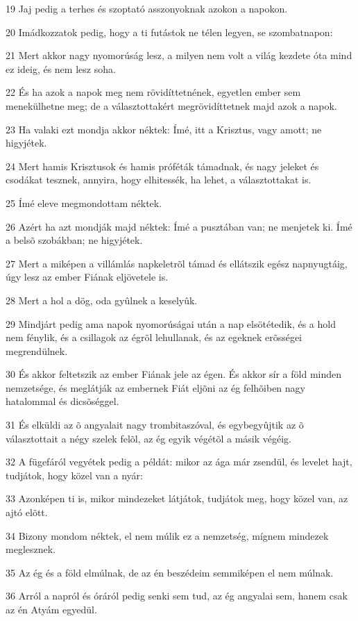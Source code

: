 \par 19 Jaj pedig a terhes és szoptató asszonyoknak azokon a napokon.
\par 20 Imádkozzatok pedig, hogy a ti futástok ne télen legyen, se szombatnapon:
\par 21 Mert akkor nagy nyomorúság lesz, a milyen nem volt a világ kezdete óta mind ez ideig, és nem lesz soha.
\par 22 És ha azok a napok meg nem rövidíttetnének, egyetlen ember sem menekülhetne meg; de a választottakért megrövidíttetnek majd azok a napok.
\par 23 Ha valaki ezt mondja akkor néktek: Ímé, itt a Krisztus, vagy amott; ne higyjétek.
\par 24 Mert hamis Krisztusok és hamis próféták támadnak, és nagy jeleket és csodákat tesznek, annyira, hogy elhitessék, ha lehet, a választottakat is.
\par 25 Ímé eleve megmondottam néktek.
\par 26 Azért ha azt mondják majd néktek: Ímé a pusztában van; ne menjetek ki. Ímé a belsõ szobákban; ne higyjétek.
\par 27 Mert a miképen a villámlás napkeletrõl támad és ellátszik egész napnyugtáig, úgy lesz az ember Fiának eljövetele is.
\par 28 Mert a hol a dög, oda gyûlnek a keselyûk.
\par 29 Mindjárt pedig ama napok nyomorúságai után a nap elsötétedik, és a hold nem fénylik, és a csillagok az égrõl lehullanak, és az egeknek erõsségei megrendülnek.
\par 30 És akkor feltetszik az ember Fiának jele az égen. És akkor sír a föld minden nemzetsége, és meglátják az embernek Fiát eljõni az ég  felhõiben nagy hatalommal és dicsõséggel.
\par 31 És elküldi az õ angyalait nagy trombitaszóval, és egybegyûjtik az õ választottait a négy szelek felõl, az ég egyik végétõl a másik végéig.
\par 32 A fügefáról vegyétek pedig a példát: mikor az ága már zsendül, és levelet hajt, tudjátok, hogy közel van a nyár:
\par 33 Azonképen ti is, mikor mindezeket látjátok, tudjátok meg, hogy közel van, az ajtó elõtt.
\par 34 Bizony mondom néktek, el nem múlik ez a nemzetség, mígnem mindezek meglesznek.
\par 35 Az ég és a föld elmúlnak, de az én beszédeim semmiképen el nem múlnak.
\par 36 Arról a napról és óráról pedig senki sem tud, az ég angyalai sem, hanem csak az én Atyám egyedül.
